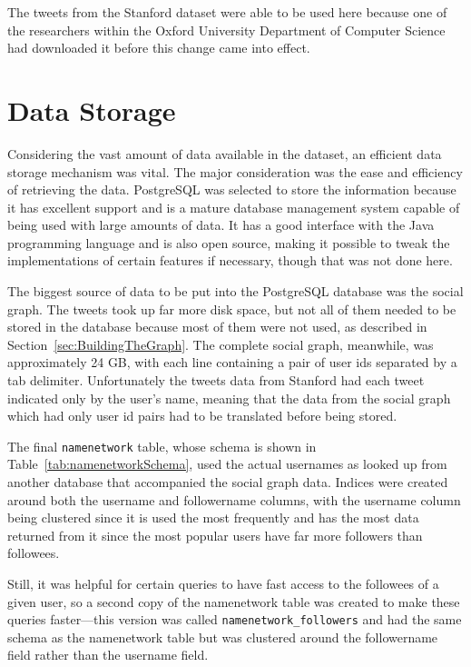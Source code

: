 The tweets from the Stanford dataset were able to be used here because one of the researchers within the Oxford University Department of Computer Science had downloaded it before this change came into effect.


\section{Data Storage}
\label{sec:DataStorage}

Considering the vast amount of data available in the dataset, an efficient data storage mechanism was vital. The major consideration was the ease and efficiency of retrieving the data. PostgreSQL was selected to store the information because it has excellent support and is a mature database management system capable of being used with large amounts of data. It has a good interface with the Java programming language and is also open source, making it possible to tweak the implementations of certain features if necessary, though that was not done here.

The biggest source of data to be put into the PostgreSQL database was the social graph. The tweets took up far more disk space, but not all of them needed to be stored in the database because most of them were not used, as described in Section~\ref{sec:BuildingTheGraph}. The complete social graph, meanwhile, was approximately 24 GB, with each line containing a pair of user ids separated by a tab delimiter. Unfortunately the tweets data from Stanford had each tweet indicated only by the user's name, meaning that the data from the social graph which had only user id pairs had to be translated before being stored.

The final \texttt{namenetwork} table, whose schema is shown in Table~\ref{tab:namenetworkSchema}, used the actual usernames as looked up from another database that accompanied the social graph data. Indices were created around both the username and followername columns, with the username column being clustered since it is used the most frequently and has the most data returned from it since the most popular users have far more followers than followees.

Still, it was helpful for certain queries to have fast access to the followees of a given user, so a second copy of the namenetwork table was created to make these queries faster---this version was called \texttt{namenetwork\_followers} and had the same schema as the namenetwork table but was clustered around the followername field rather than the username field.


